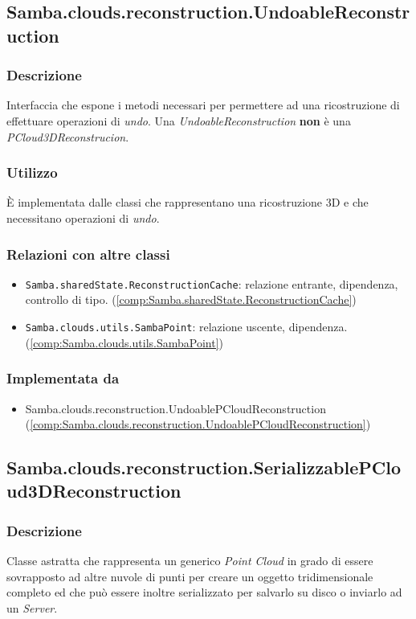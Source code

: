 \subsection{Samba.clouds.reconstruction.UndoableReconstruction}\label{comp:Samba.clouds.reconstruction.UndoableReconstruction}
\subsubsection{Descrizione}
Interfaccia che espone i metodi necessari per permettere ad una ricostruzione di effettuare operazioni di \emph{undo}. Una \emph{UndoableReconstruction} \textbf{non} è una \emph{PCloud3DReconstrucion}. 
\subsubsection{Utilizzo}
È implementata dalle classi che rappresentano una ricostruzione 3D e che necessitano operazioni di \emph{undo}.
\subsubsection{Relazioni con altre classi}
\begin{itemize}
	\item \texttt{Samba.sharedState.ReconstructionCache}: relazione entrante, dipendenza, controllo di tipo. (\ref{comp:Samba.sharedState.ReconstructionCache})
	\item \texttt{Samba.clouds.utils.SambaPoint}: relazione uscente, dipendenza. (\ref{comp:Samba.clouds.utils.SambaPoint})
\end{itemize}
\subsubsection{Implementata da}
\begin{itemize}
	\item Samba.clouds.reconstruction.UndoablePCloudReconstruction (\ref{comp:Samba.clouds.reconstruction.UndoablePCloudReconstruction})
\end{itemize}


\subsection{Samba.clouds.reconstruction.SerializzablePCloud3DReconstruction}\label{comp:Samba.clouds.reconstruction.SerializzablePCloud3DReconstruction}
\subsubsection{Descrizione}
Classe astratta che rappresenta un generico \emph{Point Cloud} in grado di essere sovrapposto ad altre nuvole di punti per creare un oggetto tridimensionale completo ed che può essere inoltre serializzato per salvarlo su disco o inviarlo ad un \emph{Server}.
